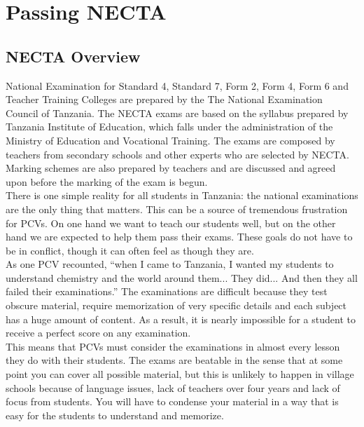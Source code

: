 \chapter{Passing NECTA}
\section{NECTA Overview}

     National Examination for Standard 4, Standard 7, Form 2, Form 4, Form 6 and Teacher Training Colleges are prepared by the The National Examination Council of Tanzania.  The NECTA exams are based on the syllabus prepared by Tanzania Institute of Education, which falls under the administration of the Ministry of Education and Vocational Training. The exams are composed by teachers from secondary schools and other experts who are selected by NECTA. Marking schemes are also prepared by teachers and are discussed and agreed upon before the marking of the exam is begun. \\
      There is one simple reality for all students in Tanzania: the national examinations are the only thing that matters.  This can be a source of tremendous frustration for PCVs.  On one hand we want to teach our students well, but on the other hand we are expected to help them pass their exams.  These goals do not have to be in conflict, though it can often feel as though they are.\\   

      As one PCV recounted, ``when I came to Tanzania, I wanted my students to understand chemistry and the world around them...  They did...  And then they all failed their examinations.''  The examinations are difficult because they test obscure material, require memorization of very specific details and each subject has a huge amount of content.  As a result, it is nearly impossible for a student to receive a perfect score on any examination.   \\

      This means that PCVs must consider the examinations in almost every lesson they do with their students.  The exams are beatable in the sense that at some point you can cover all possible material, but this is unlikely to happen in village schools because of language issues, lack of teachers over four years and lack of focus from students.  You will have to condense your material in a way that is easy for the students to understand and memorize. 

